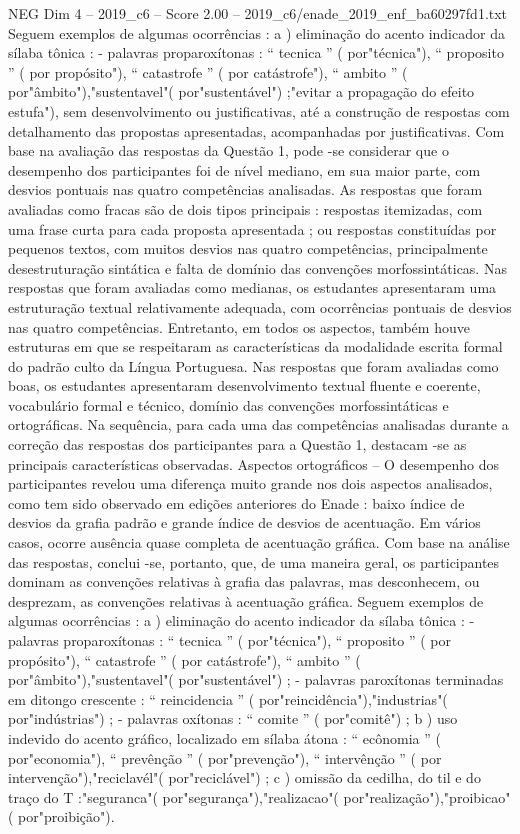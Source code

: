 \begin{textsample}{NEG Dim 4 – 2019\_c6 – Score 2.00 – 2019\_c6/enade\_2019\_enf\_ba60297fd1.txt}
Seguem exemplos de algumas ocorrências : a ) eliminação do acento indicador da sílaba tônica : - palavras proparoxítonas : “ tecnica ” ( por"técnica"), “ proposito ” ( por propósito"), “ catastrofe ” ( por catástrofe"), “ ambito ” ( por"âmbito"),"sustentavel"( por"sustentável") ;"evitar a propagação do efeito estufa"), sem desenvolvimento ou justificativas, até a construção de respostas com detalhamento das propostas apresentadas, acompanhadas por justificativas.
Com base na avaliação das respostas da Questão 1, pode -se considerar que o desempenho dos participantes foi de nível mediano, em sua maior parte, com desvios pontuais nas quatro competências analisadas.
As respostas que foram avaliadas como fracas são de dois tipos principais : respostas itemizadas, com uma frase curta para cada proposta apresentada ; ou respostas constituídas por pequenos textos, com muitos desvios nas quatro competências, principalmente desestruturação sintática e falta de domínio das convenções morfossintáticas.
Nas respostas que foram avaliadas como medianas, os estudantes apresentaram uma estruturação textual relativamente adequada, com ocorrências pontuais de desvios nas quatro competências.
Entretanto, em todos os aspectos, também houve estruturas em que se respeitaram as características da modalidade escrita formal do padrão culto da Língua Portuguesa.
Nas respostas que foram avaliadas como boas, os estudantes apresentaram desenvolvimento textual fluente e coerente, vocabulário formal e técnico, domínio das convenções morfossintáticas e ortográficas.
Na sequência, para cada uma das competências analisadas durante a correção das respostas dos participantes para a Questão 1, destacam -se as principais características observadas.
Aspectos ortográficos – O desempenho dos participantes revelou uma diferença muito grande nos dois aspectos analisados, como tem sido observado em edições anteriores do Enade : baixo índice de desvios da grafia padrão e grande índice de desvios de acentuação.
Em vários casos, ocorre ausência quase completa de acentuação gráfica.
Com base na análise das respostas, conclui -se, portanto, que, de uma maneira geral, os participantes dominam as convenções relativas à grafia das palavras, mas desconhecem, ou desprezam, as convenções relativas à acentuação gráfica.
Seguem exemplos de algumas ocorrências : a ) eliminação do acento indicador da sílaba tônica : - palavras proparoxítonas : “ tecnica ” ( por"técnica"), “ proposito ” ( por propósito"), “ catastrofe ” ( por catástrofe"), “ ambito ” ( por"âmbito"),"sustentavel"( por"sustentável") ; - palavras paroxítonas terminadas em ditongo crescente : “ reincidencia ” ( por"reincidência"),"industrias"( por"indústrias") ; - palavras oxítonas : “ comite ” ( por"comitê") ; b ) uso indevido do acento gráfico, localizado em sílaba átona : “ ecônomia ” ( por"economia"), “ prevênção ” ( por"prevenção"), “ intervênção ” ( por intervenção"),"reciclavél"( por"reciclável") ; c ) omissão da cedilha, do til e do traço do T :"seguranca"( por"segurança"),"realizacao"( por"realização"),"proibicao"( por"proibição").

\end{textsample}
